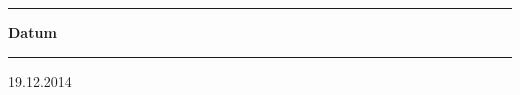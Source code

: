 \begin{titlepage}
\begin{minipage}[b]{0.91\textwidth}
	
	
	\begin{minipage}[b]{0.27\textwidth}
	\hrule\vskip 0.5cm
		\textbf{Datum}
	\end{minipage}
	\begin{minipage}[b]{0.03\textwidth}
	\hskip 0.5cm
	\end{minipage}
	\begin{minipage}[b]{0.7\textwidth}
	\hrule\vskip 0.5cm
		19.12.2014
	\end{minipage}
\end{minipage}
\vskip 0.5cm



\end{titlepage}

